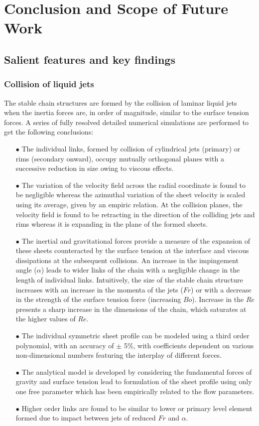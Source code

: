 \chapter{Conclusion and Scope of Future Work}
\lipsum[1]
\section{Salient features and key findings}
\subsection{Collision of liquid jets}
The stable chain structures are formed by the collision of laminar liquid jets when the inertia forces are, in order of magnitude, similar to the surface tension forces. A series of fully resolved detailed numerical simulations are performed to get the following conclusions:
\begin{enumerate}
\item [$\bullet$] The individual links, formed by collision of cylindrical jets (primary) or rims (secondary onward), occupy mutually orthogonal planes with a successive reduction in size owing to viscous effects. 
\item [$\bullet$] The variation of the velocity field across the radial coordinate is found to be negligible whereas the azimuthal variation of the sheet velocity is scaled using its average, given by an empiric relation. At the collision planes, the velocity field is found to be retracting in the direction of the colliding jets and rims whereas it is expanding in the plane of the formed sheets.
\item [$\bullet$] The inertial and gravitational forces provide a measure of the expansion of these sheets counteracted by the surface tension at the interface and viscous dissipations at the subsequent collisions. An increase in the impingement angle ($\alpha$) leads to wider links of the chain with a negligible change in the length of individual links. Intuitively, the size of the stable chain structure increases with an increase in the momenta of the jets ($Fr$) or with a decrease in the strength of the surface tension force (increasing $Bo$). Increase in the $Re$ presents a sharp increase in the dimensions of the chain, which saturates at the higher values of $Re$.
\item [$\bullet$] The individual symmetric sheet profile can be modeled using a third order polynomial, with an accuracy of $\pm$ 5\%, with coefficients dependent on various non-dimensional numbers featuring the interplay of different forces.
\item [$\bullet$] The analytical model is developed by considering the fundamental forces of gravity and surface tension lead to formulation of the sheet profile using only one free parameter which has been empirically related to the flow parameters.
\item [$\bullet$] Higher order links are found to be similar to lower or primary level element formed due to impact between jets of reduced $Fr$ and $\alpha$. 
\end{enumerate}
